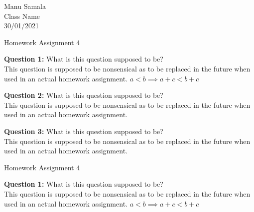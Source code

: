 \documentclass[12pt]{article}
\newcommand\Name{Manu Samala}
\newcommand\Class{Class Name}
\newcommand\Date{30/01/2021} %
\newcommand\Title{Homework Assignment 4} %
\newcommand{\nextpage}{\newpage \noindent \Title \newline}
\begin{document}
    \begin{flushleft} %

        \Name\\ %
        \Class\\ %
        \Date\\ %

        \begin{center}
            \Title
        \end{center}
        \setlength{\parindent}{0.25in} %
        \setlength{\parskip}{1em} %
        \textbf{Question 1:} What is this question supposed to be?\\
            This question is supposed to be nonsensical as to be replaced in
            the future when used in an actual homework assignment. 
            $a < b \implies a + c < b + c $

        \noindent
        \textbf{Question 2:} What is this question supposed to be?\\
            This question is supposed to be nonsensical as to be replaced in
            the future when used in an actual homework assignment.

        \noindent
        \textbf{Question 3:} What is this question supposed to be?\\
            This question is supposed to be nonsensical as to be replaced in
            the future when used in an actual homework assignment.

        \nextpage

        \noindent
        \textbf{Question 1:} What is this question supposed to be?\\
            This question is supposed to be nonsensical as to be replaced in
            the future when used in an actual homework assignment. 
            $a < b \implies a + c < b + c $

    \end{flushleft}
   
\end{document}
